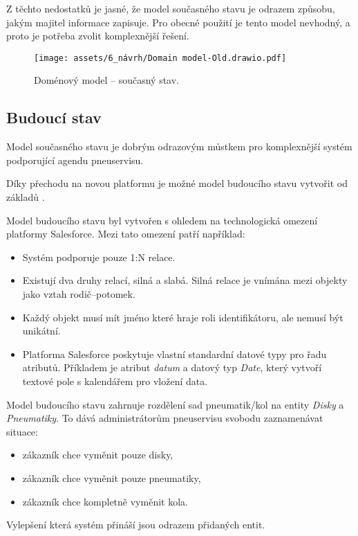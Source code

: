 Z těchto nedostatků je jasné, že model současného stavu je odrazem způsobu, jakým majitel informace zapisuje. Pro obecné použití je tento model nevhodný, a proto je potřeba zvolit komplexnější řešení.
\begin{figure}[h!]
    \centering
    \texttt{[image: assets/6\_návrh/Domain model-Old.drawio.pdf]}
    \caption{Doménový model -- současný stav.}
    \label{fig:Domain_model_-_old}
\end{figure}
\FloatBarrier
\subsection{Budoucí stav}
Model současného stavu je dobrým odrazovým můstkem pro komplexnější systém podporující agendu pneuservisu. 

Díky přechodu na novou platformu je možné model budoucího stavu vytvořit od základů .

Model budoucího stavu byl vytvořen s ohledem na technologická omezení platformy Salesforce. Mezi tato omezení patří například: 
\begin{itemize}
    \item Systém podporuje pouze 1:N relace.
    \item Existují dva druhy relací, silná a slabá. Silná relace je vnímána mezi objekty jako vztah rodič--potomek.
    \item Každý objekt musí mít jméno které hraje roli identifikátoru, ale nemusí být unikátní.
    \item Platforma Salesforce poskytuje vlastní standardní datové typy pro řadu atributů. Příkladem je atribut \emph{datum} a datový typ \emph{Date}, který vytvoří textové pole s kalendářem pro vložení data.
\end{itemize}

Model budoucího stavu zahrnuje rozdělení sad pneumatik/kol na entity \emph{Disky} a \emph{Pneumatiky}. To dává administrátorům pneuservisu svobodu zaznamenávat situace:
\begin{itemize}
    \item zákazník chce vyměnit pouze disky,
    \item zákazník chce vyměnit pouze pneumatiky,
    \item zákazník chce kompletně vyměnit kola.
\end{itemize}

Vylepšení která systém přináší jsou odrazem přidaných entit.

